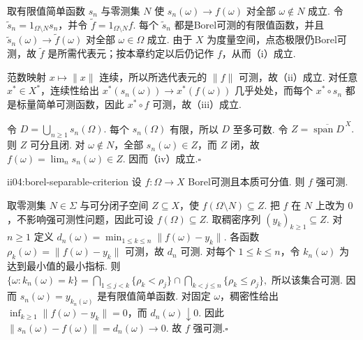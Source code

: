 \begin{FAProof}
取有限值简单函数 \(\displaystyle s_n\) 与零测集 \(\displaystyle N\) 使 \(\displaystyle s_n(\omega)\to f(\omega)\) 对全部 \(\displaystyle\omega\notin N\) 成立. 令 \(\displaystyle\widetilde s_n=1_{\Omega\setminus N}s_n\)，并令 \(\displaystyle\widetilde f=1_{\Omega\setminus N}f\). 每个 \(\displaystyle\widetilde s_n\) 都是Borel可测的有限值函数，并且 \(\displaystyle\widetilde s_n(\omega)\to\widetilde f(\omega)\) 对全部 \(\displaystyle\omega\in\Omega\) 成立. 由于 \(\displaystyle X\) 为度量空间，点态极限仍Borel可测，故 \(\displaystyle\widetilde f\) 是所需代表元；按本章约定以后仍记作 \(\displaystyle f\)，从而（i）成立.

范数映射 \(\displaystyle x\mapsto\|x\|\) 连续，所以所选代表元的 \(\displaystyle\|f\|\) 可测，故（ii）成立. 对任意 \(\displaystyle x^*\in X^*\)，连续性给出 \(\displaystyle x^*(s_n(\omega))\to x^*(f(\omega))\) 几乎处处，而每个 \(\displaystyle x^*\circ s_n\) 都是标量简单可测函数，因此 \(\displaystyle x^*\circ f\) 可测，故（iii）成立.

令
\(\displaystyle D=\bigcup_{n\geqslant1}s_n(\Omega).\)
每个 \(\displaystyle s_n(\Omega)\) 有限，所以 \(\displaystyle D\) 至多可数. 令
\(\displaystyle Z=\overline{\operatorname{span}D}^{\,X}.\)
则 \(\displaystyle Z\) 可分且闭. 对 \(\displaystyle\omega\notin N\)，全部 \(\displaystyle s_n(\omega)\in Z\)，而 \(\displaystyle Z\) 闭，故 \(\displaystyle f(\omega)=\lim_ns_n(\omega)\in Z\). 因而（iv）成立.\hfill\(\square\)
\end{FAProof}

\begin{FATheorem}[C][Borel可测与本质可分值判据]{ii04:borel-separable-criterion}
设 \(\displaystyle f:\Omega\to X\) Borel可测且本质可分值. 则 \(\displaystyle f\) 强可测.
\end{FATheorem}

\begin{FAProof}
取零测集 \(\displaystyle N\in\Sigma\) 与可分闭子空间 \(\displaystyle Z\subseteq X\)，使 \(\displaystyle f(\Omega\setminus N)\subseteq Z\). 把 \(\displaystyle f\) 在 \(\displaystyle N\) 上改为 \(\displaystyle0\)，不影响强可测性问题，因此可设 \(\displaystyle f(\Omega)\subseteq Z\). 取稠密序列 \(\displaystyle(y_k)_{k\geqslant1}\subseteq Z\). 对 \(\displaystyle n\geqslant1\) 定义
\(\displaystyle d_n(\omega)=\min_{1\leqslant k\leqslant n}\|f(\omega)-y_k\|.\)
各函数 \(\displaystyle\rho_k(\omega)=\|f(\omega)-y_k\|\) 可测，故 \(\displaystyle d_n\) 可测. 对每个 \(\displaystyle1\leqslant k\leqslant n\)，令 \(\displaystyle k_n(\omega)\) 为达到最小值的最小指标. 则
\(\displaystyle \{\omega:k_n(\omega)=k\} = \bigcap_{1\leqslant j<k}\{\rho_k<\rho_j\} \cap \bigcap_{k<j\leqslant n}\{\rho_k\leqslant\rho_j\},\)
所以该集合可测. 因而
\(\displaystyle s_n(\omega)=y_{k_n(\omega)}\)
是有限值简单函数. 对固定 \(\displaystyle\omega\)，稠密性给出 \(\displaystyle\inf_{k\geqslant1}\|f(\omega)-y_k\|=0\)，而 \(\displaystyle d_n(\omega)\downarrow0\). 因此
\(\displaystyle \|s_n(\omega)-f(\omega)\|=d_n(\omega)\longrightarrow0.\)
故 \(\displaystyle f\) 强可测.\hfill\(\square\)
\end{FAProof}

